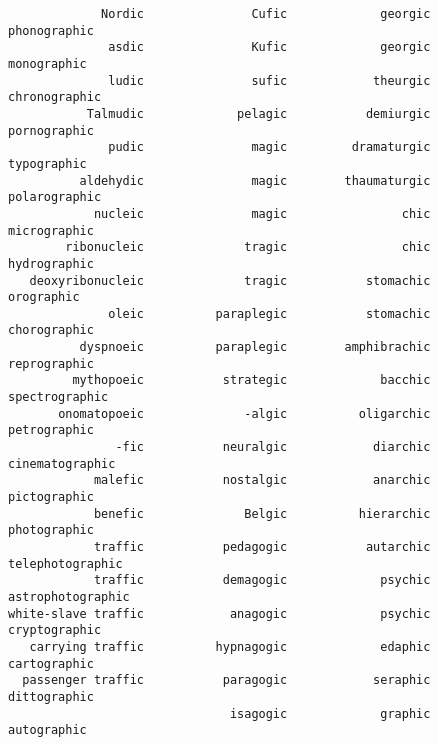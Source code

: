 \begin{verbatim}
             Nordic               Cufic             georgic        phonographic 
              asdic               Kufic             georgic         monographic 
              ludic               sufic            theurgic       chronographic 
           Talmudic             pelagic           demiurgic        pornographic 
              pudic               magic         dramaturgic         typographic 
          aldehydic               magic        thaumaturgic       polarographic 
            nucleic               magic                chic        micrographic 
        ribonucleic              tragic                chic        hydrographic 
   deoxyribonucleic              tragic           stomachic          orographic 
              oleic          paraplegic           stomachic        chorographic 
          dyspnoeic          paraplegic        amphibrachic        reprographic 
         mythopoeic           strategic             bacchic      spectrographic 
       onomatopoeic              -algic          oligarchic        petrographic 
               -fic           neuralgic            diarchic     cinematographic 
            malefic           nostalgic            anarchic        pictographic 
            benefic              Belgic          hierarchic        photographic 
            traffic           pedagogic           autarchic    telephotographic 
            traffic           demagogic             psychic   astrophotographic 
white-slave traffic            anagogic             psychic       cryptographic 
   carrying traffic          hypnagogic             edaphic        cartographic 
  passenger traffic           paragogic            seraphic        dittographic 
                               isagogic             graphic         autographic 
\end{verbatim}
\newpage

